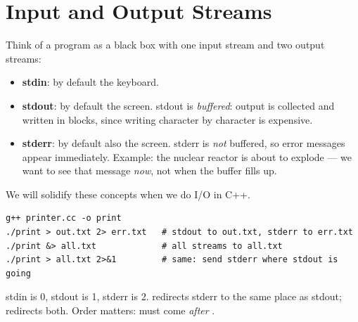 \section{Input and Output Streams}
Think of a program as a black box with one input stream and two output streams:
\begin{itemize}
  \item \textbf{stdin}: by default the keyboard.
  \item \textbf{stdout}: by default the screen. stdout is \emph{buffered}: output
        is collected and written in blocks, since writing character by character
        is expensive.
  \item \textbf{stderr}: by default also the screen. stderr is \emph{not}
        buffered, so error messages appear immediately. Example: the nuclear
        reactor is about to explode --- we want to see that message \emph{now},
        not when the buffer fills up.
\end{itemize}
We will solidify these concepts when we do I/O in C++.

\begin{center}
\end{center}

\begin{lstlisting}[style=bash]
g++ printer.cc -o print
./print > out.txt 2> err.txt   # stdout to out.txt, stderr to err.txt
./print &> all.txt             # all streams to all.txt
./print > all.txt 2>&1         # same: send stderr where stdout is going
\end{lstlisting}

\begin{important}
stdin is 0, stdout is 1, stderr is 2.  redirects stderr to the same
place as stdout; \code{\&>} redirects both. Order matters:  must come
\emph{after} .
\end{important}

